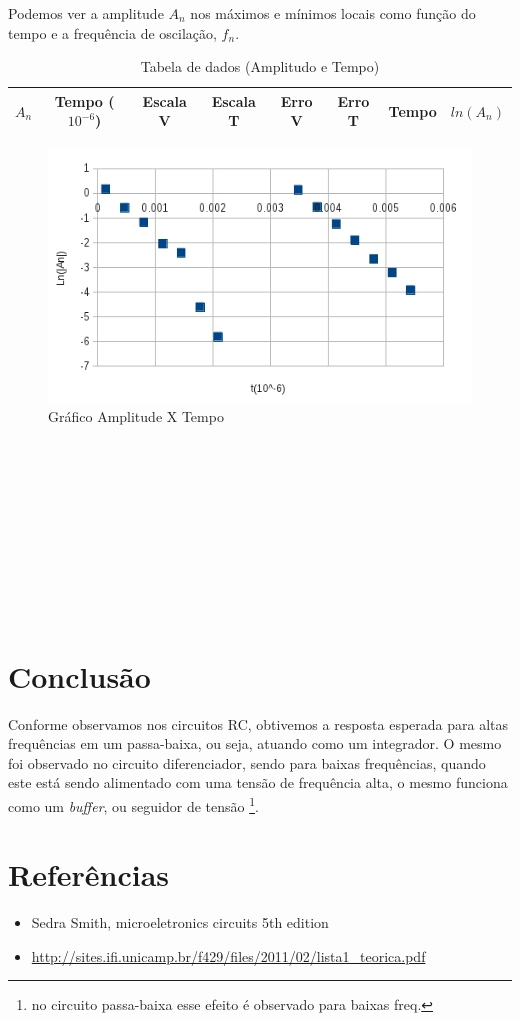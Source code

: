 \documentclass[12pt,letterpaper]{article}
\begin{document}
Podemos ver a amplitude $A_n$ nos máximos e mínimos locais como função do tempo e a frequência de oscilação, $f_n$.
\begin{table}
  \tiny
  \centering
  \begin{tabular}{|c|c|c|c|c|c|c|c|}
    \hline
    $A_n$ & Tempo ($10^{-6}$) & Escala V & Escala T & Erro V & Erro T & Tempo & $ln(A_n)$\\
    \hline
        
    \hline
  \end{tabular}
  \caption{Tabela de dados (Amplitudo e Tempo)}
\end{table}
\begin{figure}[!htb]
  \centering
  \label{mysub}
  \includegraphics[scale=0.50]{img/g1.jpg}
  \caption{Gráfico Amplitude X Tempo}
\end{figure}
\\
\\
\\
\\
\\
\\
\\
\\
\\

\section{Conclusão}
Conforme observamos nos circuitos RC, obtivemos a resposta esperada para altas frequências em um passa-baixa, ou seja, atuando como um integrador. O mesmo foi observado no circuito diferenciador, sendo para baixas frequências, quando este está sendo alimentado com uma tensão de frequência alta, o mesmo funciona como um \emph{buffer}, ou seguidor de tensão \footnote{no circuito passa-baixa esse efeito é observado para baixas freq.}.
\section{Referências}
\begin{itemize}
\item Sedra Smith, microeletronics circuits 5th edition
\item \url{http://sites.ifi.unicamp.br/f429/files/2011/02/lista1_teorica.pdf} 
\end{itemize}
\end{document}
